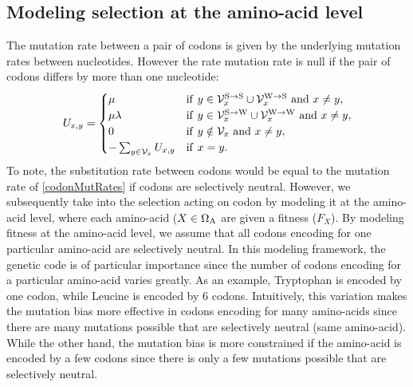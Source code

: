 \subsection{Modeling selection at the amino-acid level}
The mutation rate between a pair of codons is given by the underlying mutation rates between nucleotides. However the rate mutation rate is null if the pair of codons differs by more than one nucleotide:
\begin{equation}
\label{codonMutRates}
U_{x, y} =
\begin{cases}
\mu
& \mathrm{if} \ y \in  \mathcal{V}_x^{\mathrm{S} \rightarrow \mathrm{S}} \cup \mathcal{V}_x^{\mathrm{W} \rightarrow \mathrm{S}} \ \mathrm{ and } \ x \neq y, \\
\mu \lambda
& \mathrm{if} \ y \in \mathcal{V}_x^{\mathrm{S} \rightarrow \mathrm{W}} \cup \mathcal{V}_x^{\mathrm{W} \rightarrow \mathrm{W}}   \ \mathrm{ and } \ x \neq y, \\
0
& \mathrm{if} \  y \notin \mathcal{V}_x \ \mathrm{ and } \ x \neq y, \\
- \sum_{y \in \mathcal{V}_x }  U_{x, y} & \mathrm{if} \ x = y.
\end{cases}
\end{equation}
To note, the substitution rate between codons would be equal to the mutation rate of \ref{codonMutRates} if codons are selectively neutral. However, we subsequently take into the selection acting on codon by modeling it at the amino-acid level, where each amino-acid ($X \in \Omega_{\mathrm{A}}$ are given a fitness ($F_X$). By modeling fitness at the amino-acid level, we assume that all codons encoding for one particular amino-acid are selectively neutral. In this modeling framework, the genetic code is of particular importance since the number of codons encoding for a particular amino-acid varies greatly. As an example, Tryptophan is encoded by one codon, while Leucine is encoded by 6 codons. Intuitively, this variation makes the mutation bias more effective in codons encoding for many amino-acids since there are many mutations possible that are selectively neutral (same amino-acid). While the other hand, the mutation bias is more constrained if the amino-acid is encoded by a few codons since there is only a few mutations possible that are selectively neutral.\\

